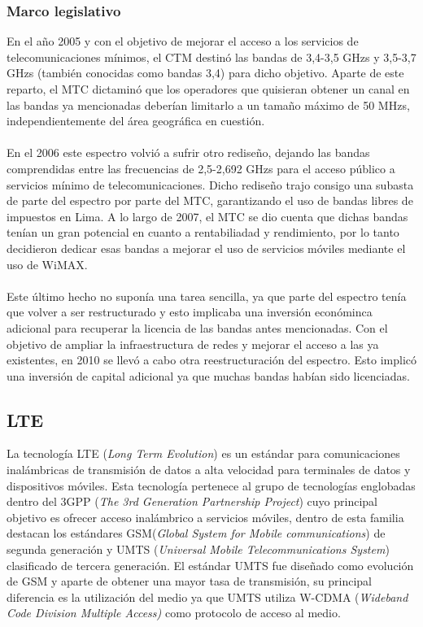 \subsubsection{Marco legislativo}
En el año 2005 y con el objetivo de mejorar el acceso a los servicios de telecomunicaciones mínimos, el CTM destinó las bandas de 3,4-3,5 GHzs y 3,5-3,7 GHzs (también conocidas como bandas 3,4) para dicho objetivo. Aparte de este reparto, el MTC dictaminó que los operadores que quisieran obtener un canal en las bandas ya mencionadas deberían limitarlo a un tamaño máximo de 50 MHzs, independientemente del área geográfica en cuestión.\\\\

En el 2006 este espectro volvió a sufrir otro rediseño, dejando las bandas comprendidas entre las frecuencias de 2,5-2,692 GHzs para el acceso público a servicios mínimo de telecomunicaciones. Dicho rediseño trajo consigo una subasta de parte del espectro por parte del MTC, garantizando el uso de bandas libres de impuestos en Lima. A lo largo de 2007, el MTC se dio cuenta que dichas bandas tenían un gran potencial en cuanto a rentabiliadad y rendimiento, por lo tanto decidieron dedicar esas bandas a mejorar el uso de servicios móviles mediante el uso de WiMAX.\\\\

Este último hecho no suponía una tarea sencilla, ya que parte del espectro tenía que volver a ser restructurado y esto implicaba una inversión económinca adicional para recuperar la licencia de las bandas antes mencionadas. Con el objetivo de ampliar la infraestructura de redes y mejorar el acceso a las ya existentes, en 2010 se llevó a cabo otra reestructuración del espectro. Esto implicó una inversión de capital adicional ya que muchas bandas habían sido licenciadas.

\subsection{LTE}
La tecnología LTE (\textit{Long Term Evolution}) es un estándar para comunicaciones inalámbricas de transmisión de datos a alta velocidad para terminales de datos y dispositivos móviles. Esta tecnología pertenece al grupo de tecnologías englobadas dentro del 3GPP (\textit{The 3rd Generation Partnership Project}) cuyo principal objetivo es ofrecer acceso inalámbrico a servicios móviles, dentro de esta familia destacan los estándares GSM(\textit{Global System for Mobile communications}) de segunda generación y UMTS (\textit{Universal Mobile Telecommunications System}) clasificado de tercera generación. El estándar UMTS fue diseñado como evolución de GSM y aparte de obtener una mayor tasa de transmisión, su principal diferencia es la utilización del medio ya que UMTS utiliza W-CDMA (\textit{Wideband Code Division Multiple Access)} como protocolo de acceso al medio.\\\\

